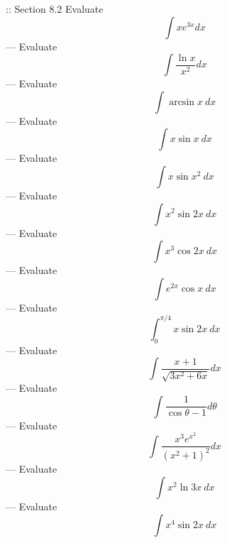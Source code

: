 :: Section 8.2
Evaluate
\[\int xe^{3x}dx\]
---
Evaluate
\[\int\frac{\ln x}{x^2}dx\]
---
Evaluate
\[\int\arcsin x\ dx\]
---
Evaluate
\[\int x\sin x\ dx\]
---
Evaluate
\[\int x\sin x^2\ dx\]
---
Evaluate
\[\int x^2\sin 2x\ dx\]
---
Evaluate
\[\int x^3\cos 2x\ dx\]
---
Evaluate
\[\int e^{2x}\cos x\ dx\]
---
Evaluate
\[\int_0^{\pi/4}x\sin 2x\ dx\]
---
Evaluate
\[\int\frac{x+1}{\sqrt{3x^2+6x}}dx\]
---
Evaluate
\[\int\frac{1}{\cos\theta -1}d\theta\]
---
Evaluate
\[\int\frac{x^3e^{x^2}}{(x^2+1)^2}dx\]
---
Evaluate
\[\int x^2\ln 3x\ dx\]
---
Evaluate
\[\int x^4\sin 2x\ dx\]
